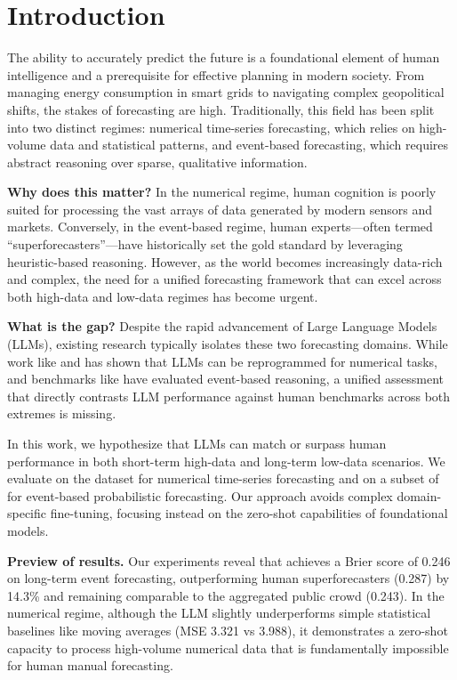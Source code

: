 \section{Introduction}

The ability to accurately predict the future is a foundational element of human intelligence and a prerequisite for effective planning in modern society. From managing energy consumption in smart grids to navigating complex geopolitical shifts, the stakes of forecasting are high. Traditionally, this field has been split into two distinct regimes: numerical time-series forecasting, which relies on high-volume data and statistical patterns, and event-based forecasting, which requires abstract reasoning over sparse, qualitative information.

{\bf Why does this matter?} In the numerical regime, human cognition is poorly suited for processing the vast arrays of data generated by modern sensors and markets. Conversely, in the event-based regime, human experts---often termed ``superforecasters''---have historically set the gold standard by leveraging heuristic-based reasoning. However, as the world becomes increasingly data-rich and complex, the need for a unified forecasting framework that can excel across both high-data and low-data regimes has become urgent.

{\bf What is the gap?} Despite the rapid advancement of Large Language Models (LLMs), existing research typically isolates these two forecasting domains. While work like \timellm \cite{jin2024timellm} and \onefitsall \cite{zhou2023onefitsall} has shown that LLMs can be reprogrammed for numerical tasks, and benchmarks like \forecastbench \cite{karger2025forecastbench} have evaluated event-based reasoning, a unified assessment that directly contrasts LLM performance against human benchmarks across both extremes is missing.

In this work, we hypothesize that LLMs can match or surpass human performance in both short-term high-data and long-term low-data scenarios. We evaluate \methodname on the \ettm dataset for numerical time-series forecasting and on a subset of \forecastbench for event-based probabilistic forecasting. Our approach avoids complex domain-specific fine-tuning, focusing instead on the zero-shot capabilities of foundational models.

{\bf Preview of results.} Our experiments reveal that \methodname achieves a Brier score of 0.246 on long-term event forecasting, outperforming human superforecasters (0.287) by 14.3\% and remaining comparable to the aggregated public crowd (0.243). In the numerical regime, although the LLM slightly underperforms simple statistical baselines like moving averages (MSE 3.321 vs 3.988), it demonstrates a zero-shot capacity to process high-volume numerical data that is fundamentally impossible for human manual forecasting.

